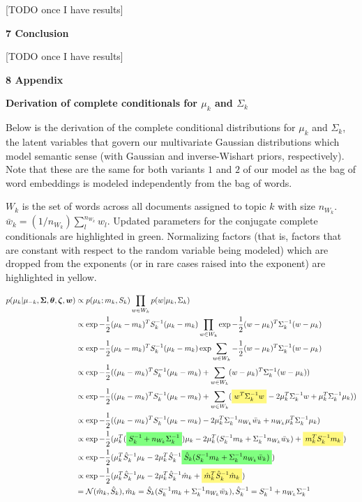 \documentclass[12pt]{article}
\newcommand{\ghighlight}[1]{%
  \colorbox{green!50}{$\displaystyle#1$}}
\newcommand{\yhighlight}[1]{%
  \colorbox{yellow!50}{$\displaystyle#1$}}
\begin{document}
[TODO once I have results]

\textbf{7 Conclusion}

[TODO once I have results]


\textbf{8 Appendix}

\textbf{Derivation of complete conditionals for $\mu_k$ and $\Sigma_k$}

Below is the derivation of the complete conditional distributions for $\mu_k$ and $\Sigma_k$, the latent variables that govern our multivariate Gaussian distributions which model semantic sense (with Gaussian and inverse-Wishart priors, respectively).  Note that these are the same for both variants $1$ and $2$ of our model as the bag of word embeddings is modeled independently from the bag of words.

$W_k$ is the set of words across all documents assigned to topic $k$ with size $n_{W_k}$.  $\bar{w}_k = (1/n_{W_k})\sum^{n_{W_k}}_l w_l$.  Updated parameters for the conjugate complete conditionals are highlighted in green.  Normalizing factors (that is, factors that are constant with respect to the random variable being modeled) which are dropped from the exponents (or in rare cases raised into the exponent) are highlighted in yellow.

\begin{align*}
p(\mu_k | \mu_{-k}, \bm{\Sigma}, \bm{\theta}, \bm{\zeta}, \bm{w}) & \propto p(\mu_k; m_k, S_k) \prod_{w \in W_k} p(w | \mu_k, \Sigma_k) \\
& \propto \exp{-\frac{1}{2}(\mu_k - m_k)^T S_k^{-1} (\mu_k - m_k)} \prod_{w \in W_k} \exp{-\frac{1}{2}(w - \mu_k)^T \Sigma_k^{-1} (w - \mu_k)} \\
& \propto \exp{-\frac{1}{2}(\mu_k - m_k)^T S_k^{-1} (\mu_k - m_k)} \exp{\sum_{w \in W_k} -\frac{1}{2}(w - \mu_k)^T \Sigma_k^{-1} (w - \mu_k)} \\
& \propto \exp{-\frac{1}{2}((\mu_k - m_k)^T S_k^{-1} (\mu_k - m_k) + \sum_{w \in W_k} (w - \mu_k)^T \Sigma_k^{-1} (w - \mu_k))} \\
& \propto \exp{-\frac{1}{2}((\mu_k - m_k)^T S_k^{-1} (\mu_k - m_k) + \sum_{w \in W_k}(\yhighlight{w^T\Sigma_k^{-1}w} - 2 \mu_k^T\Sigma_k^{-1}w + \mu_k^T\Sigma_k^{-1}\mu_k))} \\
& \propto \exp{-\frac{1}{2}((\mu_k - m_k)^T S_k^{-1} (\mu_k - m_k) - 2 \mu_k^T\Sigma_k^{-1}n_{W_k}\bar{w}_k + n_{W_k}\mu_k^T\Sigma_k^{-1}\mu_k)} \\
& \propto \exp{-\frac{1}{2}(\mu_k^T(\ghighlight{S_k^{-1} + n_{W_k}\Sigma_k^{-1}})\mu_k - 2\mu_k^T(S_k^{-1}m_k + \Sigma_k^{-1}n_{W_k}\bar{w}_k) + \yhighlight{m_k^TS_k^{-1}m_k})} \\
& \propto \exp{-\frac{1}{2}(\mu_k^T\hat{S}_k^{-1}\mu_k - 2\mu_k^T\hat{S}_k^{-1}\ghighlight{\hat{S}_k(S_k^{-1}m_k + \Sigma_k^{-1}n_{W_k}\bar{w}_k)})} \\
& \propto \exp{-\frac{1}{2}(\mu_k^T\hat{S}_k^{-1}\mu_k - 2\mu_k^T\hat{S}_k^{-1}\hat{m}_k + \yhighlight{\hat{m}_k^T\hat{S}_k^{-1}\hat{m}_k})} \\
& = \mathcal{N}(\hat{m}_k, \hat{S}_k), \hat{m}_k = \hat{S}_k(S_k^{-1}m_k + \Sigma_k^{-1}n_{W_k}\bar{w}_k), \hat{S}_k^{-1} = S_k^{-1} + n_{W_k}\Sigma_k^{-1}
\end{align*}
\end{document}
